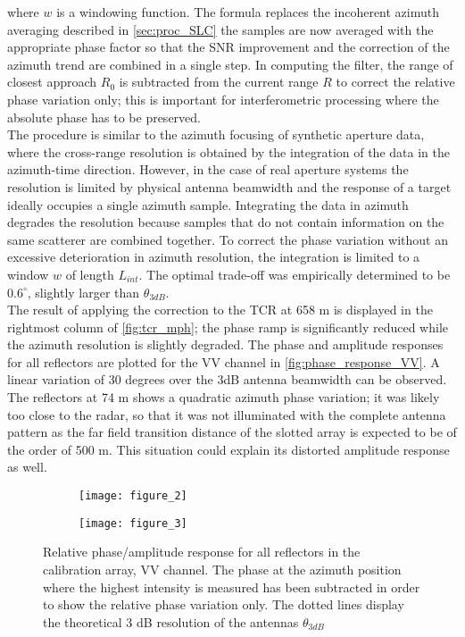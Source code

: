 where $w$ is a windowing function. The formula replaces the incoherent azimuth averaging described in \autoref{sec:proc_SLC} the samples are now averaged with the appropriate phase factor so that the SNR improvement and the correction of the azimuth trend are combined in a single step. In computing the filter, the range of closest approach $R_{0}$ is subtracted from the current range $R$ to correct the relative phase variation only; this is important for interferometric processing where the absolute phase has to be preserved.\\
The procedure is similar to the azimuth focusing of synthetic aperture data, where the cross-range resolution is obtained by the integration of the data in the azimuth-time direction. However, in the case of real aperture systems the resolution is limited by  physical antenna beamwidth and the response of a target ideally occupies a single azimuth sample. Integrating the data in azimuth degrades the resolution because samples that do not contain information on the same scatterer are combined together. To correct the phase variation without an excessive deterioration in azimuth resolution, the integration is limited to a window  $w$ of length $L_{int}$. The optimal trade-off was empirically determined to be $0.6^\circ$, slightly larger than $\theta_{3dB}$.\\
The result of applying the correction to the TCR at 658 m is displayed in the rightmost column of \autoref{fig:tcr_mph}; the phase ramp is significantly reduced while the azimuth resolution is slightly degraded.
The phase and amplitude responses for all reflectors are plotted for the VV channel in \autoref{fig:phase_response_VV}. A linear variation of 30 degrees over the 3dB antenna beamwidth can be observed. The reflectors at 74 m shows a quadratic azimuth phase variation; it was likely too close to the radar, so that it was not illuminated with the complete antenna pattern as the far field transition distance of the slotted array is expected to be of the order of 500 m. This situation could explain its distorted amplitude response as well. 
\begin{figure}[ht]
	\begin{subfigure}[t]{\columnwidth}
		\texttt{[image: figure\_2]}
	\end{subfigure}
	\begin{subfigure}[t]{\columnwidth}
		\texttt{[image: figure\_3]}
	\end{subfigure}
	\caption{Relative phase/amplitude response for all reflectors in the calibration array, VV channel. The phase at the azimuth position where the highest intensity is measured has been subtracted in order to show the relative phase variation only. The dotted lines display the theoretical 3 dB resolution of the antennas $\theta_{3dB}$}
	\label{fig:phase_response_VV}
\end{figure}
